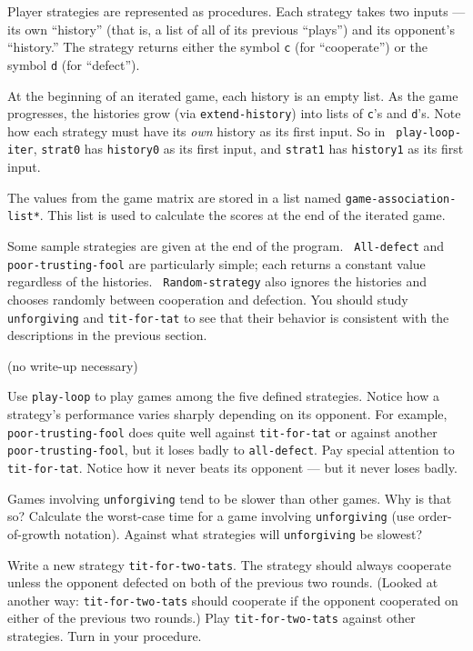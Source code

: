 Player strategies are represented as procedures. Each strategy takes
two inputs --- its own ``history'' (that is, a list of all of its
previous ``plays'') and its opponent's ``history.'' The strategy
returns either the symbol {\tt c} (for ``cooperate'') or the symbol
{\tt d} (for ``defect'').

At the beginning of an iterated game, each history is an empty list.
As the game progresses, the histories grow (via {\tt extend-history})
into lists of {\tt c}'s and {\tt d}'s. Note how each strategy must
have its {\it own} history as its first input. So in {\tt
play-loop-iter}, {\tt strat0} has {\tt history0} as its first input,
and {\tt strat1} has {\tt history1} as its first input.

The values from the game matrix are stored in a list named
{\tt *game-association-list*}. This list is used to calculate the scores at
the end of the iterated game.

Some sample strategies are given at the end of the program. {\tt
All-defect} and {\tt poor-trusting-fool} are particularly simple; each
returns a constant value regardless of the histories. {\tt
Random-strategy} also ignores the histories and chooses randomly
between cooperation and defection. You should study {\tt unforgiving} and
{\tt tit-for-tat} to see that their behavior is consistent with the
descriptions in the previous section.

\vskip 8pt

 (no write-up necessary)

Use {\tt play-loop} to play games among the five defined strategies.
Notice how a strategy's performance varies sharply depending on its
opponent.  For example, {\tt poor-trusting-fool} does quite well
against {\tt tit-for-tat} or against another {\tt poor-trusting-fool},
but it loses badly to {\tt all-defect}.  Pay special attention to {\tt
tit-for-tat}. Notice how it never beats its opponent --- but it never
loses badly.

\vskip 8pt


Games involving {\tt unforgiving} tend to be slower than other games.
Why is that so? Calculate the worst-case time for a game involving
{\tt unforgiving} (use order-of-growth notation). Against what
strategies will {\tt unforgiving} be slowest?

\vskip 8pt


Write a new strategy {\tt tit-for-two-tats}. The strategy should always
cooperate unless the opponent defected on both of the previous two
rounds. (Looked at another way: {\tt tit-for-two-tats} should cooperate if
the opponent cooperated on either of the previous two rounds.) Play
{\tt tit-for-two-tats} against other strategies.  Turn in your
procedure.


